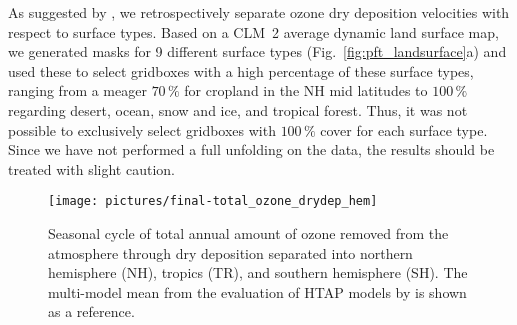 \documentclass[gmd, manuscript]{copernicus}
\begin{document}
As suggested by \citet{ACP:Hardacre2015}, we retrospectively separate ozone dry deposition velocities with respect to surface types. Based on a CLM~2 average dynamic land surface map, we generated masks for 9 different surface types (Fig.~\ref{fig:pft_landsurface}a) and used these to select gridboxes with a high percentage of these surface types, ranging from a meager $70\,\unit{\%}$ for cropland in the NH mid latitudes to $100\,\unit{\%}$ regarding desert, ocean, snow and ice, and tropical forest. Thus, it was not possible to exclusively select gridboxes with $100\,\unit{\%}$ cover for each surface type. Since we have not performed a full unfolding on the data, the results should be treated with slight caution. 
%
\begin{figure*}[t]
  \texttt{[image: pictures/final-total\_ozone\_drydep\_hem]}
  \caption{Seasonal cycle of total annual amount of ozone removed from the atmosphere through dry deposition separated into northern hemisphere (NH), tropics (TR), and southern hemisphere (SH). The multi-model mean from the evaluation of HTAP models by \citet{ACP:Hardacre2015} is shown as a reference.}
  \label{fig:mmm_drydep_hem}
\end{figure*}
%
\end{document}

